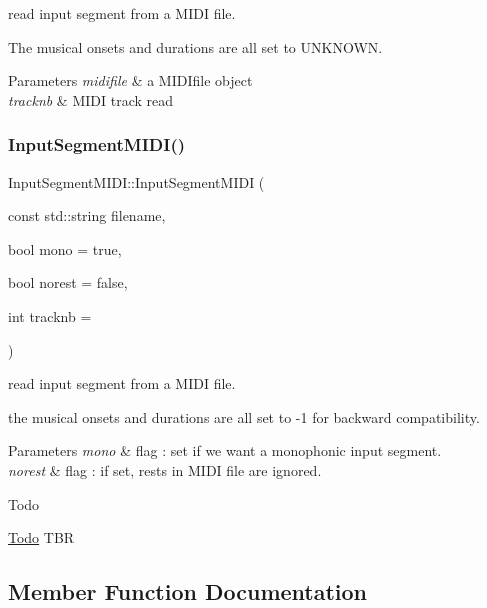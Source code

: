 read input segment from a M\+I\+DI file. 

The musical onsets and durations are all set to U\+N\+K\+N\+O\+WN. 
\begin{DoxyParams}{Parameters}
{\em midifile} & a M\+I\+D\+Ifile object \\
\hline
{\em tracknb} & M\+I\+DI track read \\
\hline
\end{DoxyParams}
\mbox{\label{classInputSegmentMIDI_a97c065fd510e9a925e12e44b6378f394}} 
\subsubsection{\texorpdfstring{InputSegmentMIDI()}{InputSegmentMIDI()}\hspace{0.1cm}{\footnotesize\ttfamily [3/3]}}
{\footnotesize\ttfamily Input\+Segment\+M\+I\+D\+I\+::\+Input\+Segment\+M\+I\+DI (\begin{DoxyParamCaption}\item[{const std\+::string}]{filename,  }\item[{bool}]{mono = {\ttfamily true},  }\item[{bool}]{norest = {\ttfamily false},  }\item[{int}]{tracknb = {} }\end{DoxyParamCaption})}



read input segment from a M\+I\+DI file. 

the musical onsets and durations are all set to -\/1 for backward compatibility. 
\begin{DoxyParams}{Parameters}
{\em mono} & flag \+: set if we want a monophonic input segment. \\
\hline
{\em norest} & flag \+: if set, rests in M\+I\+DI file are ignored.\\
\hline
\end{DoxyParams}
\begin{DoxyRefDesc}{Todo}
\item[\mbox{\hyperlink{todo__todo000002}{Todo}}]T\+BR \end{DoxyRefDesc}


\subsection{Member Function Documentation}
\mbox{\label{classInputSegmentMIDI_a936c91d6d4d71d1e968808064455e9d4}} 
